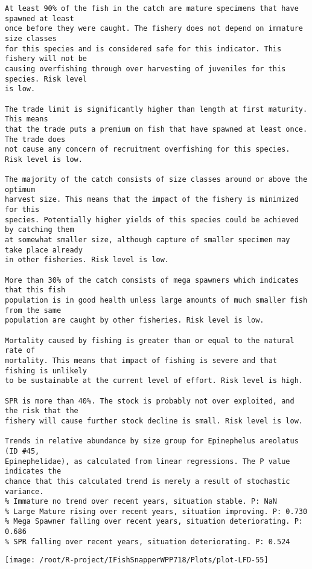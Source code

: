 \documentclass{report}\usepackage[]{graphicx}\usepackage[]{color}
\makeatletter
\def\maxwidth{ %
  \ifdim\Gin@nat@width>\linewidth
    \linewidth
  \else
    \Gin@nat@width
  \fi
}
\newenvironment{kframe}{%
 \def\at@end@of@kframe{}%
 \ifinner\ifhmode%
  \def\at@end@of@kframe{\end{minipage}}%
  \begin{minipage}{\columnwidth}%
 \fi\fi%
 \def\FrameCommand##1{\hskip\@totalleftmargin \hskip-\fboxsep
 \colorbox{shadecolor}{##1}\hskip-\fboxsep
     \hskip-\linewidth \hskip-\@totalleftmargin \hskip\columnwidth}%
 \MakeFramed {\advance\hsize-\width
   \@totalleftmargin\z@ \linewidth\hsize
   \@setminipage}}%
 {\par\unskip\endMakeFramed%
 \at@end@of@kframe}
\newenvironment{knitrout}{}{} %
\makeatother
\begin{document}
\begin{knitrout}
\begin{kframe}
\begin{verbatim}
At least 90% of the fish in the catch are mature specimens that have spawned at least
once before they were caught. The fishery does not depend on immature size classes
for this species and is considered safe for this indicator. This fishery will not be
causing overfishing through over harvesting of juveniles for this species. Risk level
is low.

The trade limit is significantly higher than length at first maturity.  This means
that the trade puts a premium on fish that have spawned at least once. The trade does
not cause any concern of recruitment overfishing for this species. Risk level is low.

The majority of the catch consists of size classes around or above the optimum
harvest size. This means that the impact of the fishery is minimized for this
species. Potentially higher yields of this species could be achieved by catching them
at somewhat smaller size, although capture of smaller specimen may take place already
in other fisheries. Risk level is low.

More than 30% of the catch consists of mega spawners which indicates that this fish
population is in good health unless large amounts of much smaller fish from the same
population are caught by other fisheries. Risk level is low.
 
Mortality caused by fishing is greater than or equal to the natural rate of
mortality. This means that impact of fishing is severe and that fishing is unlikely
to be sustainable at the current level of effort. Risk level is high.
 
SPR is more than 40%. The stock is probably not over exploited, and the risk that the
fishery will cause further stock decline is small. Risk level is low.
 
Trends in relative abundance by size group for Epinephelus areolatus (ID #45,
Epinephelidae), as calculated from linear regressions. The P value indicates the
chance that this calculated trend is merely a result of stochastic variance.
% Immature no trend over recent years, situation stable. P: NaN
% Large Mature rising over recent years, situation improving. P: 0.730
% Mega Spawner falling over recent years, situation deteriorating. P: 0.686
% SPR falling over recent years, situation deteriorating. P: 0.524
\end{verbatim}
\end{kframe}
\texttt{[image: /root/R-project/IFishSnapperWPP718/Plots/plot-LFD-55]} 


\end{knitrout}
\end{document}
